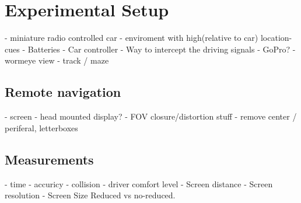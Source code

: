 \chapter{Experimental Setup}
- miniature radio controlled car
- enviroment with high(relative to car) location-cues
- Batteries
- Car controller
- Way to intercept the driving signals
- GoPro?
- wormeye view
- track / maze

\section{Remote navigation}
- screen
- head mounted display?
- FOV closure/distortion stuff
- remove center / periferal, letterboxes


\section{Measurements}
- time
- accuricy
- collision
- driver comfort level
- Screen distance
- Screen resolution
- Screen Size
Reduced vs no-reduced.